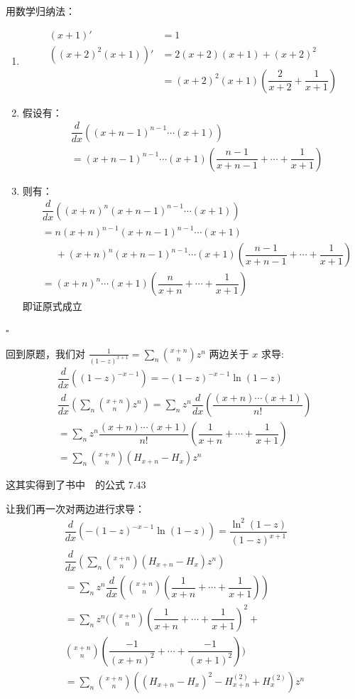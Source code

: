 用数学归纳法：
\begin{enumerate}
  \item[1.]
    \begin{align*}
      (x+1)' &= 1 \\
      ((x+2)^2 (x+1))' &= 2(x+2)(x+1) + (x+2)^2 \\
      &= (x+2)^2 (x+1) \left( \dfrac{2}{x+2} + \dfrac{1}{x+1} \right)
    \end{align*}
  \item[2.] 假设有：
    \begin{align*}
      & \dfrac{d}{dx} \left( (x+n-1)^{n-1} \cdots (x+1) \right) \\
      &= (x+n-1)^{n-1} \cdots (x+1) \left( \dfrac{n-1}{x+n-1} + \cdots + \dfrac{1}{x+1} \right)
    \end{align*}
  \item[3.] 则有：
    \begin{align*}
      & \dfrac{d}{dx} \left( (x+n)^n (x+n-1)^{n-1} \cdots (x+1) \right) \\
      &= n (x+n)^{n-1} (x+n-1)^{n-1} \cdots (x+1) \\
      & \phantom{=} + (x+n)^n (x+n-1)^{n-1} \cdots (x+1) \left( \dfrac{n-1}{x+n-1} + \cdots + \dfrac{1}{x+1} \right) \\
      &= (x+n)^n \cdots (x+1) \left( \dfrac{n}{x+n} + \cdots + \dfrac{1}{x+1} \right)
    \end{align*}
    即证原式成立
\end{enumerate}
\hfill \( \square \)

回到原题，我们对 \( \displaystyle \frac{1}{(1-z)^{x+1}} = \sum_n \binom{x+n}{n} z^n \) 两边关于 \( x \) 求导:
\begin{gather*}
  \dfrac{d}{dx} ((1-z)^{-x-1}) = -(1-z)^{-x-1} \ln{(1-z)} \\
  \dfrac{d}{dx} \left(\sum_n \binom{x+n}{n} z^n \right) = \sum_n z^n \dfrac{d}{dx} \left( \dfrac{(x+n) \cdots (x+1)}{n!} \right) \\
  = \sum_n z^n \dfrac{(x+n) \cdots (x+1)}{n!} (\dfrac{1}{x+n} + \cdots + \dfrac{1}{x+1}) \\
  = \sum_n \binom{x+n}{n} (H_{x+n} - H_x) z^n
\end{gather*}

这其实得到了书中~\cite{graham1994concrete}~的公式 \( 7.43 \)

让我们再一次对两边进行求导：
\begin{gather*}
  \dfrac{d}{dx} ( -(1-z)^{-x-1} \ln{(1-z)} ) = \dfrac{\ln^2{(1-z)}}{(1-z)^{x+1}} \\
  \dfrac{d}{dx} \left( \sum_n \binom{x+n}{n} (H_{x+n} - H_x) z^n \right) \\
  = \sum_n z^n \dfrac{d}{dx} \left( \binom{x+n}{n} (\dfrac{1}{x+n} + \cdots + \dfrac{1}{x+1} ) \right) \\
  = \sum_n z^n \biggl( \binom{x+n}{n} (\dfrac{1}{x+n} + \cdots + \dfrac{1}{x+1})^2 + \\
  \binom{x+n}{n} (\dfrac{-1}{(x+n)^2} + \cdots + \dfrac{-1}{(x+1)^2}) \biggr) \\
  = \sum_n \binom{x+n}{n} ((H_{x+n} - H_x)^2 - H_{x+n}^{(2)} + H_x^{(2)} ) z^n
\end{gather*}


